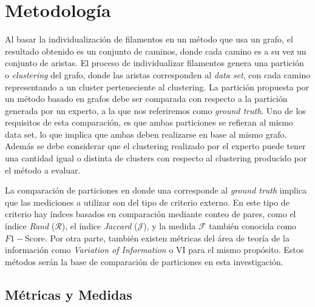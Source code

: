 \chapter{Metodolog\'ia}
\label{chap:metodologia}

Al basar la individualizaci\'on de filamentos en un m\'etodo que usa un grafo, el resultado obtenido es un conjunto de caminos, donde cada camino es a su vez un conjunto de aristas. El proceso de individualizar filamentos genera una partici\'on o {\it clustering} del grafo, donde las aristas corresponden al {\it data set}, con cada camino representando a un cluster perteneciente al clustering. La partici\'on propuesta por un m\'etodo basado en grafos debe ser comparada con respecto a la partici\'on generada por un experto, a la que nos referiremos como {\it ground truth}. Uno de los requisitos de esta comparaci\'on, es que ambas particiones se refieran al mismo data set, lo que implica que ambas deben realizarse en base al mismo grafo. Adem\'as se debe considerar que el clustering realizado por el experto puede tener una cantidad igual o distinta de clusters con respecto al clustering producido por el m\'etodo a evaluar.


La comparaci\'on de particiones en donde una corresponde al {\it ground truth} implica que las mediciones a utilizar son del tipo de criterio externo\cite{manning20introduction}. En este tipo de criterio hay \'indces basados en comparaci\'on mediante conteo de pares, como el \'indice {\it Rand} ($\mathcal{R}$), el \'indice {\it Jaccard} ($\mathcal{J}$), y la medida $\mathcal{F}$ tambi\'en conocida como $F1-$Score. Por otra parte, tambi\'en existen m\'etricas del \'area de teor\'ia de la informaci\'on como {\it Variation of Information} o VI para el mismo prop\'osito. Estos m\'etodos ser\'an la base de comparaci\'on de particiones en esta investigaci\'on.

\section{M\'etricas y Medidas}
\label{sec:metricasymedidas}

